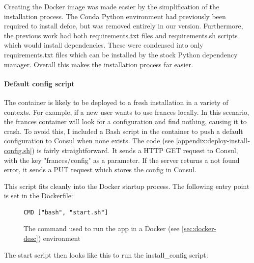\documentclass[12pt, letterpaper]{article}
\begin{document}
\begin{flushleft}
Creating the Docker image was made easier by the simplification of the installation process. The Conda Python environment had previously been required to install defoe, but was removed entirely in our version. Furthermore, the previous work had both requirements.txt files and requirements.sh scripts which would install dependencies. These were condensed into only requirements.txt files which can be installed by the stock Python dependency manager. Overall this makes the installation process far easier.
\end{flushleft}

\paragraph{Default config script}\label{sec:impl-default-config}

\begin{flushleft}
The container is likely to be deployed to a fresh installation in a variety of contexts. For example, if a new user wants to use frances locally. In this scenario, the frances container will look for a configuration and find nothing, causing it to crash. To avoid this, I included a Bash script in the container to push a default configuration to Consul when none exists. The code (see \ref{appendix:deploy-install-config.sh}) is fairly straightforward. It sends a HTTP GET request to Consul, with the key "frances/config" as a parameter. If the server returns a not found error, it sends a PUT request which stores the config in Consul.
\end{flushleft}

\begin{flushleft}
This script fits cleanly into the Docker startup process. The following entry point is set in the Dockerfile:
\end{flushleft}

\begin{flushleft}
\begin{figure}[H]
\begin{verbatim}
CMD ["bash", "start.sh"] 
\end{verbatim}
\caption{The command used to run the app in a Docker (see \ref{sec:docker-desc}) environment}
\end{figure}
\end{flushleft}

The start script then looks like this to run the install\_config script:
\end{document}
